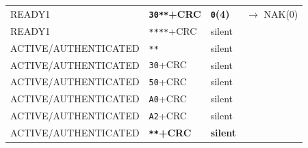 \begin{longtable}{l l l l}
READY1               & \textbf{\texttt{30**}+CRC}          & \textbf{\texttt{0}(4)}   & $\rightarrow$ NAK(0)               \\
READY1               & \texttt{****}+CRC                   & silent          &                                             \\
ACTIVE/AUTHENTICATED & \texttt{**}                         & silent          &                                             \\
ACTIVE/AUTHENTICATED & \texttt{30}+CRC                     & silent          &                                             \\
ACTIVE/AUTHENTICATED & \texttt{50}+CRC                     & silent          &                                             \\
ACTIVE/AUTHENTICATED & \texttt{A0}+CRC                     & silent          &                                             \\
ACTIVE/AUTHENTICATED & \texttt{A2}+CRC                     & silent          &                                             \\
ACTIVE/AUTHENTICATED & \textbf{\texttt{**}+CRC}            & \textbf{silent} &                                             \\


\end{longtable}
